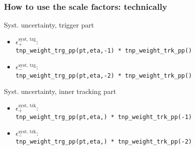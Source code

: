 \documentclass[10pt]{beamer}
\begin{document}
 \begin{frame}
  \frametitle{How to use the scale factors: technically}
  
  \begin{block}{Syst. uncertainty, trigger part}
  \begin{itemize}
   \item \alert{$\epsilon^\text{syst, trg}_{+}$}: \\\texttt{tnp\_weight\_trg\_pp(pt,eta,\alert{-1}) * tnp\_weight\_trk\_pp()}
   
   \item \alert{$\epsilon^\text{syst, trg}_{-}$}: \\\texttt{tnp\_weight\_trg\_pp(pt,eta,\alert{-2}) * tnp\_weight\_trk\_pp()}
   \end{itemize}
  \end{block}
  
    \begin{block}{Syst. uncertainty, inner tracking part}
  \begin{itemize}
   \item \alert{$\epsilon^\text{syst, trk}_{+}$}: \\\texttt{tnp\_weight\_trg\_pp(pt,eta,) * tnp\_weight\_trk\_pp(\alert{-1})}
   
   \item \alert{$\epsilon^\text{syst, trk}_{-}$}: \\\texttt{tnp\_weight\_trg\_pp(pt,eta,) * tnp\_weight\_trk\_pp(\alert{-2})}
   \end{itemize}
  \end{block}
  

 \end{frame}
\end{document}
